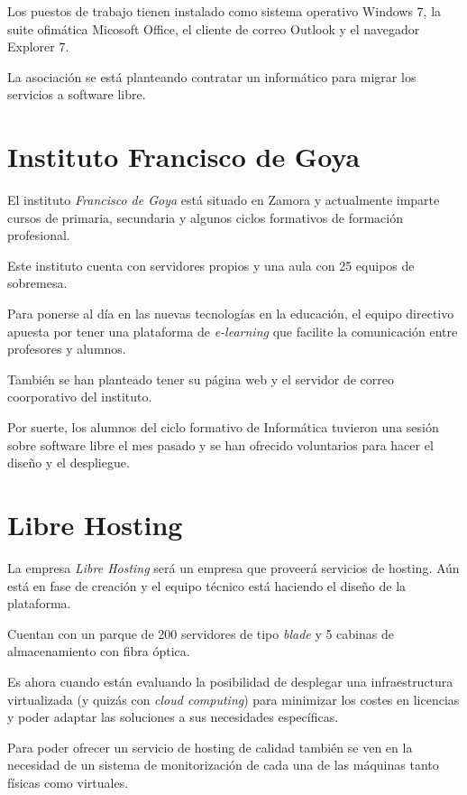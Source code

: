 \documentclass[a4paper]{article}
\begin{document}
  Los puestos de trabajo tienen instalado como sistema operativo Windows 7, la suite ofimática Micosoft Office, el cliente
  de correo Outlook y el navegador Explorer 7.
  
  La asociación se está planteando contratar un informático para migrar los servicios a software libre.
  
  
  \section{Instituto Francisco de Goya}
  El instituto \textit{Francisco de Goya} está situado en Zamora y actualmente imparte cursos de primaria, secundaria y algunos
  ciclos formativos de formación profesional.
  
  Este instituto cuenta con servidores propios y una aula con 25 equipos de sobremesa.
  
  Para ponerse al día en las nuevas tecnologías en la educación, el equipo directivo apuesta por tener una plataforma de
  \textit{e-learning} que facilite la comunicación entre profesores y alumnos.
  
  También se han planteado tener su página web y el servidor de correo coorporativo del instituto.
  
  Por suerte, los alumnos del ciclo formativo de Informática tuvieron una sesión sobre software libre el mes pasado y se
  han ofrecido voluntarios para hacer el diseño y el despliegue.
  
  
  \section{Libre Hosting}
  La empresa \textit{Libre Hosting} será un empresa que proveerá servicios de hosting. Aún está en fase de creación y
  el equipo técnico está haciendo el diseño de la plataforma.
  
  Cuentan con un parque de 200 servidores de tipo \textit{blade} y 5 cabinas de almacenamiento con fibra óptica.
  
  Es ahora cuando están evaluando la posibilidad de desplegar una infraestructura virtualizada (y quizás con 
  \textit{cloud computing}) para minimizar los costes en licencias y poder adaptar las soluciones a sus necesidades
  específicas.
  
  Para poder ofrecer un servicio de hosting de calidad también se ven en la necesidad de un sistema de monitorización
  de cada una de las máquinas tanto físicas como virtuales.
  
  
 
\end{document}
